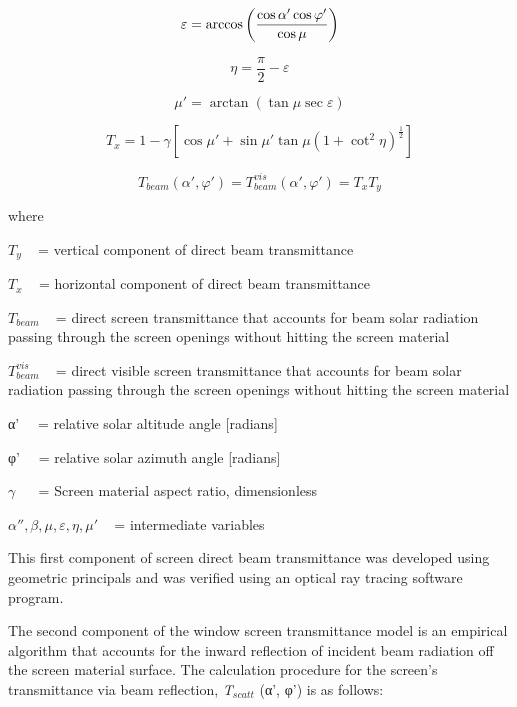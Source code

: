 \begin{equation}
  \varepsilon  = \arccos \PB{\frac{\cos \alpha '\cos \varphi '}{\cos \mu}}
\end{equation}

\begin{equation}
\eta  = \frac{\pi }{2} - \varepsilon
\end{equation}

\begin{equation}
\mu ' = \arctan \left( {\tan \mu \sec \varepsilon } \right)
\end{equation}

\begin{equation}
{T_x} = 1 - \gamma \left[ {\cos \mu ' + \sin \mu '\tan \mu {{\left( {1 + {{\cot }^2}\eta } \right)}^{\frac{1}{2}}}} \right]
\end{equation}

\begin{equation}
{T_{beam}}\left( {\alpha ',\varphi '} \right) = T_{beam}^{vis}\left( {\alpha ',\varphi '} \right) = {T_x}{T_y}
\end{equation}

where

\({T_y}\) ~ = vertical component of direct beam transmittance

\({T_x}\) ~ = horizontal component of direct beam transmittance

\({T_{beam}}\) ~ = direct screen transmittance that accounts for beam solar radiation passing through the screen openings without hitting the screen material

\(T_{beam}^{vis}\) ~ = direct visible screen transmittance that accounts for beam solar radiation passing through the screen openings without hitting the screen material

α'~~ = relative solar altitude angle {[}radians{]}

φ'~~ = relative solar azimuth angle {[}radians{]}

\(\gamma\) ~~ = Screen material aspect ratio, dimensionless

\(\alpha '',\beta ,\mu ,\varepsilon ,\eta ,\mu '\) ~ = intermediate variables

This first component of screen direct beam transmittance was developed using geometric principals and was verified using an optical ray tracing software program.

The second component of the window screen transmittance model is an empirical algorithm that accounts for the inward reflection of incident beam radiation off the screen material surface. The calculation procedure for the screen's transmittance via beam reflection, \emph{T\(_{scatt}\)} (α', φ') is as follows:

